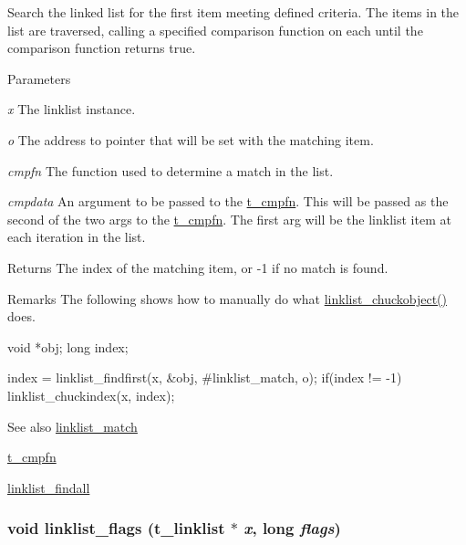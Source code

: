 Search the linked list for the first item meeting defined criteria. The items in the list are traversed, calling a specified comparison function on each until the comparison function returns true.


\begin{DoxyParams}{Parameters}
\item[{\em x}]The linklist instance. \item[{\em o}]The address to pointer that will be set with the matching item. \item[{\em cmpfn}]The function used to determine a match in the list. \item[{\em cmpdata}]An argument to be passed to the \hyperlink{group__datastore_gaaf4ae6dd800a2be9abd645cf70aeb38f}{t\_\-cmpfn}. This will be passed as the second of the two args to the \hyperlink{group__datastore_gaaf4ae6dd800a2be9abd645cf70aeb38f}{t\_\-cmpfn}. The first arg will be the linklist item at each iteration in the list. \end{DoxyParams}
\begin{DoxyReturn}{Returns}
The index of the matching item, or -\/1 if no match is found.
\end{DoxyReturn}
\begin{DoxyRemark}{Remarks}
The following shows how to manually do what \hyperlink{group__linklist_ga6621c47c664c57d794ea2540b62d0956}{linklist\_\-chuckobject()} does. 
\begin{DoxyCode}
    void *obj;
    long index;
    
    index = linklist_findfirst(x, &obj, #linklist_match, o);
    if(index != -1)
        linklist_chuckindex(x, index);
\end{DoxyCode}

\end{DoxyRemark}
\begin{DoxySeeAlso}{See also}
\hyperlink{group__linklist_ga2a991fb645404fe7d9d3327e5a386b80}{linklist\_\-match} 

\hyperlink{group__datastore_gaaf4ae6dd800a2be9abd645cf70aeb38f}{t\_\-cmpfn} 

\hyperlink{group__linklist_ga20253bd1c04d260171435d6b547ac787}{linklist\_\-findall} 
\end{DoxySeeAlso}
\hypertarget{group__linklist_gacb89cb9e0a3b6c8e631dd00734643cdb}{
\subsubsection[{linklist\_\-flags}]{\setlength{\rightskip}{0pt plus 5cm}void linklist\_\-flags ({\bf t\_\-linklist} $\ast$ {\em x}, \/  long {\em flags})}}
\label{group__linklist_gacb89cb9e0a3b6c8e631dd00734643cdb}


